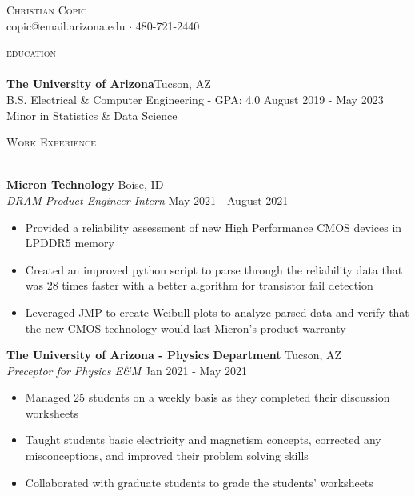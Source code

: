 \documentclass[12pt]{article}
\newcommand{\lineunder} {
    \vspace*{-8pt} \\
    \hspace*{-18pt} \hrulefill \\
}
\newcommand{\header} [1] {
    {\hspace*{-18pt}\vspace*{6pt} \textsc{#1}}
    \vspace*{-6pt} \lineunder
}
\begin{document}
\vspace*{-40pt}

    

\vspace*{-10pt}
\begin{center}
	{\Huge \scshape {Christian Copic}}\\
	copic@email.arizona.edu $\cdot$ 480-721-2440\\
	\begin{comment}$\cdot$ github.com\end{comment} 
\end{center}

\header{education}
\textbf{The University of Arizona}\hfill Tucson, AZ\\
B.S. Electrical \& Computer Engineering - GPA: 4.0
\hfill August 2019 - May 2023\\
Minor in Statistics \& Data Science


\vspace{2mm}

\header{Work Experience}
\vspace{1mm}

\textbf{Micron Technology} \hfill Boise, ID\\
\textit{DRAM Product Engineer Intern} \hfill May 2021 - August 2021\\
\vspace{-1mm}
\begin{itemize} \itemsep 1pt
	\item Provided a reliability assessment of new High Performance CMOS devices in LPDDR5 memory
	\item Created an improved python script to parse through the reliability data that was 28 times faster with a better algorithm for transistor fail detection
	\item Leveraged JMP to create Weibull plots to analyze parsed data and verify that the new CMOS technology would last Micron's product warranty
\end{itemize}

\textbf{The University of Arizona - Physics Department} \hfill Tucson, AZ\\
\textit{Preceptor for Physics E\&M} \hfill Jan 2021 - May 2021\\
\vspace{-1mm}
\begin{itemize} \itemsep 1pt
\vspace{-2mm}

	\item Managed 25 students on a weekly basis as they completed their discussion worksheets
	\item Taught students basic electricity and magnetism concepts, corrected any misconceptions, and improved their problem solving skills 
	\item Collaborated with graduate students to grade the students' worksheets 
\end{itemize}
\end{document}
